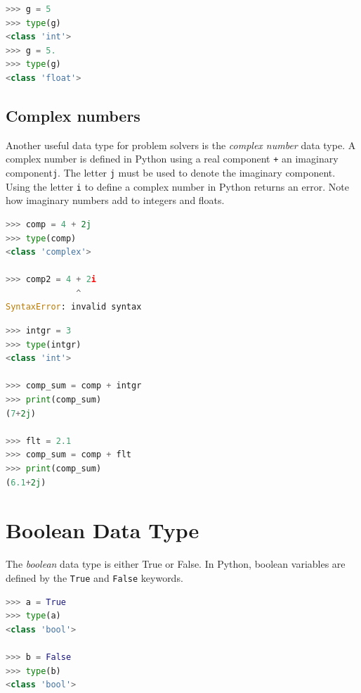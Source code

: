\documentclass{book}
\begin{document}
\begin{lstlisting}[language=Python]
>>> g = 5
>>> type(g)
<class 'int'>
>>> g = 5.
>>> type(g)
<class 'float'>
\end{lstlisting}
    




    
        \subsection{Complex numbers}\label{complex-numbers}

Another useful data type for problem solvers is the \emph{complex
number} data type. A complex number is defined in Python using a real
component \lstinline!+! an imaginary component\lstinline!j!. The letter
\lstinline!j! must be used to denote the imaginary component. Using the
letter \lstinline!i! to define a complex number in Python returns an
error. Note how imaginary numbers add to integers and floats.

\begin{lstlisting}[language=Python]
>>> comp = 4 + 2j
>>> type(comp)
<class 'complex'>

>>> comp2 = 4 + 2i
              ^
SyntaxError: invalid syntax
\end{lstlisting}

\begin{lstlisting}[language=Python]
>>> intgr = 3
>>> type(intgr)
<class 'int'>

>>> comp_sum = comp + intgr
>>> print(comp_sum)
(7+2j)

>>> flt = 2.1
>>> comp_sum = comp + flt
>>> print(comp_sum)
(6.1+2j)
\end{lstlisting}
    




    
        \section{Boolean Data Type}\label{boolean-data-type}
    




    
        The \emph{boolean} data type is either True or False. In Python, boolean
variables are defined by the \lstinline!True! and \lstinline!False!
keywords.

\begin{lstlisting}[language=Python]
>>> a = True
>>> type(a)
<class 'bool'>

>>> b = False
>>> type(b)
<class 'bool'>
\end{lstlisting}
\end{document}
